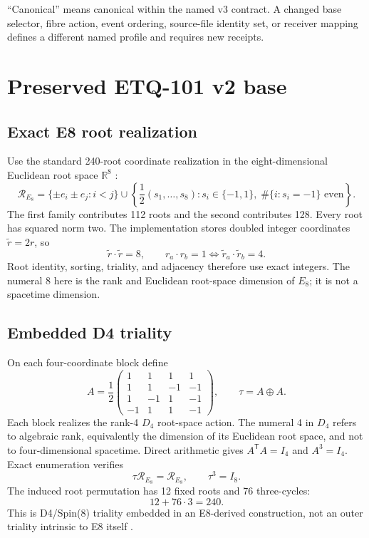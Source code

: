 \documentclass[11pt,a4paper]{article}
\theoremstyle{definition}
\begin{document}
``Canonical'' means canonical within the named v3 contract. A changed base selector, fibre action, event ordering, source-file identity set, or receiver mapping defines a different named profile and requires new receipts.

\section{Preserved ETQ-101 v2 base}
\subsection{Exact E8 root realization}
Use the standard 240-root coordinate realization in the eight-dimensional Euclidean root space $\mathbb R^8$ \cite{bourbaki2002lie,baez2002octonions,dechant2016e8}:
\begin{equation}
\mathcal R_{E_8}=
\{\pm e_i\pm e_j:i<j\}
\cup
\left\{\frac12(s_1,\ldots,s_8):s_i\in\{-1,1\},\;\#\{i:s_i=-1\}\text{ even}\right\}.
\end{equation}
The first family contributes 112 roots and the second contributes 128. Every root has squared norm two. The implementation stores doubled integer coordinates $\widetilde r=2r$, so
\begin{equation}
\widetilde r\cdot\widetilde r=8,
\qquad
r_a\cdot r_b=1\iff \widetilde r_a\cdot\widetilde r_b=4.
\end{equation}
Root identity, sorting, triality, and adjacency therefore use exact integers. The numeral 8 here is the rank and Euclidean root-space dimension of $E_8$; it is not a spacetime dimension.

\subsection{Embedded D4 triality}
On each four-coordinate block define
\begin{equation}
A=\frac12
\begin{pmatrix}
1&1&1&1\\
1&1&-1&-1\\
1&-1&1&-1\\
-1&1&1&-1
\end{pmatrix},
\qquad
\tau=A\oplus A.
\end{equation}
Each block realizes the rank-4 $D_4$ root-space action. The numeral 4 in $D_4$ refers to algebraic rank, equivalently the dimension of its Euclidean root space, and not to four-dimensional spacetime. Direct arithmetic gives $A^{\mathsf T}A=I_4$ and $A^3=I_4$. Exact enumeration verifies
\begin{equation}
\tau\mathcal R_{E_8}=\mathcal R_{E_8},
\qquad
\tau^3=I_8.
\end{equation}
The induced root permutation has 12 fixed roots and 76 three-cycles:
\begin{equation}
12+76\cdot3=240.
\end{equation}
This is D4/Spin(8) triality embedded in an E8-derived construction, not an outer triality intrinsic to E8 itself \cite{baez2002octonions}.
\end{document}
